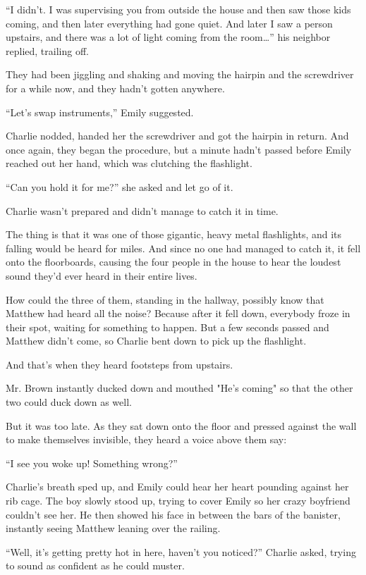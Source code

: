 “I didn't. I was supervising you from outside the house and then saw those kids coming, and then later everything had gone quiet. And later I saw a person upstairs, and there was a lot of light coming from the room…” his neighbor replied, trailing off.

They had been jiggling and shaking and moving the hairpin and the screwdriver for a while now, and they hadn't gotten anywhere.

“Let's swap instruments,” Emily suggested.

Charlie nodded, handed her the screwdriver and got the hairpin in return. And once again, they began the procedure, but a minute hadn't passed before Emily reached out her hand, which was clutching the flashlight.

“Can you hold it for me?” she asked and let go of it.

Charlie wasn't prepared and didn't manage to catch it in time.

The thing is that it was one of those gigantic, heavy metal flashlights, and its falling would be heard for miles. And since no one had managed to catch it, it fell onto the floorboards, causing the four people in the house to hear the loudest sound they'd ever heard in their entire lives.

How could the three of them, standing in the hallway, possibly know that Matthew had heard all the noise? Because after it fell down, everybody froze in their spot, waiting for something to happen. But a few seconds passed and Matthew didn't come, so Charlie bent down to pick up the flashlight.

And that's when they heard footsteps from upstairs.

Mr. Brown instantly ducked down and mouthed "He's coming" so that the other two could duck down as well.

But it was too late. As they sat down onto the floor and pressed against the wall to make themselves invisible, they heard a voice above them say:

“I see you woke up! Something wrong?”

Charlie's breath sped up, and Emily could hear her heart pounding against her rib cage. The boy slowly stood up, trying to cover Emily so her crazy boyfriend couldn't see her. He then showed his face in between the bars of the banister, instantly seeing Matthew leaning over the railing.

“Well, it's getting pretty hot in here, haven't you noticed?” Charlie asked, trying to sound as confident as he could muster.

